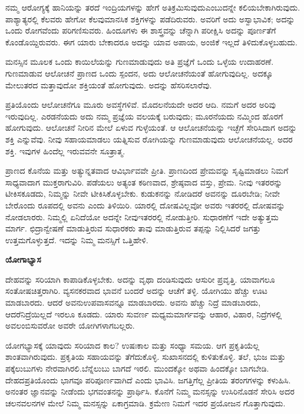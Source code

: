 ನಮ್ಮ ಆರೋಗ್ಯಕ್ಕೆ ಹಾನಿಯನ್ನು ತರದೆ ಇಂದ್ರಿಯಗಳನ್ನು ಹೇಗೆ ಅತಿಕ್ರಮಿಸುವುದು\break ಎಂಬುದನ್ನೇ ಕಲಿಯಬೇಕಾಗಿರುವುದು. ಪಾಶ್ಯಾತ್ಯರಲ್ಲಿ ಕೆಲವರು ಹೇಗೋ ಕೆಲವು\break ಮಾನಸಿಕ ಶಕ್ತಿಗಳನ್ನು ಪಡೆದಿರುವರು. ಅವರಿಗೆ ಅದು ಅಸ್ವಾಭಾವಿಕ; ಅದನ್ನು ಒಂದು ರೋಗವೆಂದು ಪರಿಗಣಿಸುವರು. ಹಿಂದೂಗಳು ಈ ಶಾಸ್ತ್ರವನ್ನು ಚೆನ್ನಾಗಿ ಪರೀಕ್ಷಿಸಿ ಅದನ್ನು ಪೂರ್ಣತೆಗೆ ಕೊಂಡೊಯ್ದಿರುವರು. ಈಗ ಯಾರು ಬೇಕಾದರೂ ಅದನ್ನು ಯಾವ ಅಪಾಯ, ಅಂಜಿಕೆ ಇಲ್ಲದೆ ತಿಳಿದುಕೊಳ್ಳಬಹುದು.

ಮನಸ್ಸಿನ ಮೂಲಕ ಒಂದು ಕಾಯಿಲೆಯನ್ನು ಗುಣಮಾಡುವುದು ಅತಿ ಪ್ರಜ್ಞೆಗೆ ಒಂದು ಒಳ್ಳೆಯ ಉದಾಹರಣೆ. ಗುಣಮಾಡುವ ಆಲೋಚನೆ ಪ್ರಾಣದ ಒಂದು ಸ್ಪಂದನ, ಅದು ಆಲೋಚನೆಯಂತೆ ಹೋಗುವುದಿಲ್ಲ. ಅದಕ್ಕೂ ಮೇಲುತರದ ಮತ್ತಾವುದೋ ಶಕ್ತಿಯಂತೆ ಹೋಗುವುದು. ಅದನ್ನು ಹೆಸರಿಸಲಾರೆವು.

ಪ್ರತಿಯೊಂದು ಆಲೋಚನೆಗೂ ಮೂರು ಅವಸ್ಥೆಗಳಿವೆ. ಮೊದಲನೆಯದೇ ಅದರ ಆದಿ. ನಮಗೆ ಅದರ ಅರಿವು ಇರುವುದಿಲ್ಲ. ಎರಡನೆಯದು ಅದು ನಮ್ಮ ಪ್ರಜ್ಞೆಯ ವಲಯಕ್ಕೆ ಬರುವುದು; ಮೂರನೆಯದು ನಮ್ಮಿಂದ ಹೊರಗೆ ಹೋಗುವುದು. ಆಲೋಚನೆ ನೀರಿನ ಮೇಲೆ ಏಳುವ ಗುಳ್ಳೆಯಂತೆ. ಆ ಆಲೋಚನೆಯನ್ನು ಇಚ್ಛೆಗೆ ಸೇರಿಸಿದಾಗ ಅದನ್ನು ಶಕ್ತಿ ಎನ್ನುವೆವು. ನೀವು ಸಹಾಯಮಾಡಲು ಯತ್ನಿಸುವ ರೋಗಿಯನ್ನು ಗುಣಮಾಡುವುದು ಆಲೋಚನೆಯಲ್ಲ. ಅದರ ಶಕ್ತಿ. ಇವುಗಳ ಹಿಂದೆಲ್ಲ ಇರುವವನೇ ಸೂತ್ರಾತ್ಮ.

ಪ್ರಾಣದ ಕೊನೆಯ ಮತ್ತು ಅತ್ಯುನ್ನತವಾದ ಆವಿರ್ಭಾವವೇ ಪ್ರೀತಿ. ಪ್ರಾಣದಿಂದ ಪ್ರೇಮವನ್ನು ಸೃಷ್ಟಿಮಾಡಲು ನಿಮಗೆ ಸಾಧ್ಯವಾದಾಗ ಮುಕ್ತರಾಗುವಿರಿ. ಪಡೆಯಲು ಅತ್ಯಂತ ಕಠಿಣವಾದ, ಶ್ರೇಷ್ಠವಾದ ವಸ್ತು, ಪ್ರೇಮ. ನೀವು ಇತರರನ್ನು ಟೀಕಿಸಕೂಡದು, ನಿಮ್ಮನ್ನು ನೀವೇ ಟೀಕಿಸಿಕೊಳ್ಳಬೇಕು. ಕುಡುಕನನ್ನು ನೋಡಿದರೆ ಅವನನ್ನು ದೂರಬೇಡಿ; ನೀವೇ ಬೇರೊಂದು ರೂಪದಲ್ಲಿ ಅವನು ಎಂದು ತಿಳಿಯಿರಿ. ಯಾರಲ್ಲಿ ದೋಷವಿಲ್ಲವೋ ಅವರು ಇತರರಲ್ಲಿ ದೋಷವನ್ನು ನೋಡಲಾರರು. ನಿಮ್ಮಲ್ಲಿ ಏನಿದೆಯೋ ಅದನ್ನೇ ನೀವು\break ಇತರರಲ್ಲಿ ನೋಡುತ್ತೀರಿ. ಸುಧಾರಣೆಗೆ ಇದೇ ಅತ್ಯುತ್ತಮ ಮಾರ್ಗ. ಛಿದ್ರಾನ್ವೇಷಣೆ ಮಾಡುತ್ತಿರುವ ಸುಧಾರಕರು ತಾವು ಮಾಡುತ್ತಿರುವ ತಪ್ಪನ್ನು ನಿಲ್ಲಿಸಿದರೆ ಜಗತ್ತು ಉತ್ತಮ\-ಗೊಳ್ಳುತ್ತದೆ. ಇದನ್ನು ನಿಮ್ಮ ಮನಸ್ಸಿಗೆ ಒತ್ತಿಹೇಳಿ.

\centerline{\textbf{ಯೋಗಾಭ್ಯಾಸ}}

ದೇಹವನ್ನು ಸರಿಯಾಗಿ ಕಾಪಾಡಿಕೊಳ್ಳಬೇಕು. ಅದನ್ನು ವೃಥಾ ದಂಡಿಸುವುದು ಆಸುರೀ ಪ್ರವೃತ್ತಿ. ಯಾವಾಗಲೂ ಸಂತೋಷಚಿತ್ತರಾಗಿರಿ. ವ್ಯಸನಕರವಾದ ಭಾವನೆ ಬಂದರೆ ಅದನ್ನು ಆಚೆಗೆ ತಳ್ಳಿ. ಯೋಗಿಯು ಹೆಚ್ಚು ಊಟ ಮಾಡಬಾರದು. ಆದರೆ ಅವನು\break ಉಪವಾಸವನ್ನೂ ಮಾಡಬಾರದು. ಅವನು ಹೆಚ್ಚು ನಿದ್ರೆ ಮಾಡಬಾರದು, ಆದರೆ\break ನಿದ್ರೆಯಿಲ್ಲದೆ ಇರಲೂ ಕೂಡದು. ಯಾರು ಸುವರ್ಣ ಮಧ್ಯಮಮಾರ್ಗವನ್ನು ಆಹಾರ, ವಿಹಾರ, ನಿದ್ರೆಗಳಲ್ಲಿ ಅವಲಂಬಿಸುವರೋ ಅವರೇ ಯೋಗಿಗಳಾಗಬಲ್ಲರು.

ಯೋಗಭ್ಯಾಸಕ್ಕೆ ಯಾವುದು ಸರಿಯಾದ ಕಾಲ? ಉಷಃಕಾಲ ಮತ್ತು ಸಂಧ್ಯಾ ಸಮಯ. ಆಗ ಪ್ರಕೃತಿಯೆಲ್ಲ ಶಾಂತವಾಗಿರುವುದು. ಪ್ರಕೃತಿಯ ಸಹಾಯವನ್ನು ತೆಗೆದುಕೊಳ್ಳಿ. ಸುಖಾಸನದಲ್ಲಿ ಕುಳಿತುಕೊಳ್ಳಿ. ತಲೆ, ಭುಜ ಮತ್ತು ಪಕ್ಕೆಲುಬುಗಳು ನೇರವಾಗಿರಲಿ.\break ಬೆನ್ನೆಲುಬು ಬಾಗದೆ ಇರಲಿ. ಮುಂದಕ್ಕೋ ಅಥವಾ ಹಿಂದಕ್ಕೋ ಬಾಗಬೇಡಿ. ದೇಹದ\break ಪ್ರತಿಯೊಂದು ಭಾಗವೂ ಪರಿಪೂರ್ಣವಾಗಿದೆ ಎಂದು ಭಾವಿಸಿ. ಜಗತ್ತಿಗೆಲ್ಲ ಪ್ರೀತಿಯ ತರಂಗಗಳನ್ನು ಕಳುಹಿಸಿ. ಅನಂತರ ಜ್ಞಾನವನ್ನು ನೀಡೆಂದು ಭಗವಂತನನ್ನು ಪ್ರಾರ್ಥಿಸಿ. ಕೊನೆಗೆ ನಿಮ್ಮ ಮನಸ್ಸನ್ನು ಉಸಿರಿನೊಡನೆ ಸೇರಿಸಿ ಅದರ ಚಲನವಲನಗಳ ಮೇಲೆ ನಿಮ್ಮ ಮನಸ್ಸನ್ನು ಏಕಾಗ್ರಮಾಡಿ. ಕ್ರಮೇಣ ನಿಮಗೆ ಇದರ ಪ್ರಯೋಜನ ಗೊತ್ತಾಗುವುದು.

